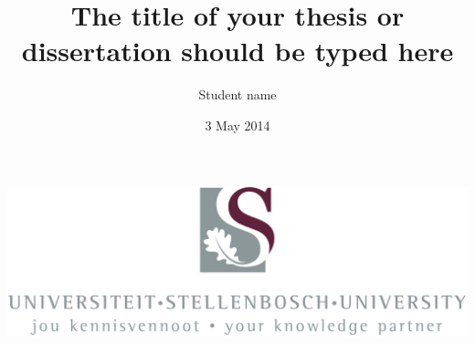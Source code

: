 \documentclass[serif,11pt]{beamer}
\newcommand*{\superscript}[1]{\ensuremath{^{\rm #1}}}
\begin{document}
\title[{\sc The short title of your thesis } \hspace{0.8cm} \insertframenumber/\inserttotalframenumber]{{\sc The title of your thesis or dissertation should be typed here }}
\author[Presentation to some students --- {\sc  May 3\superscript{rd}, 2012}]{{Student name}}
\date{3 May 2014}

\begin{frame}
\begin{center}
\vspace{0.1cm}
\includegraphics[scale=0.25]{USlogo.pdf}
\end{center}
\titlepage
\end{frame}

















\end{document}
